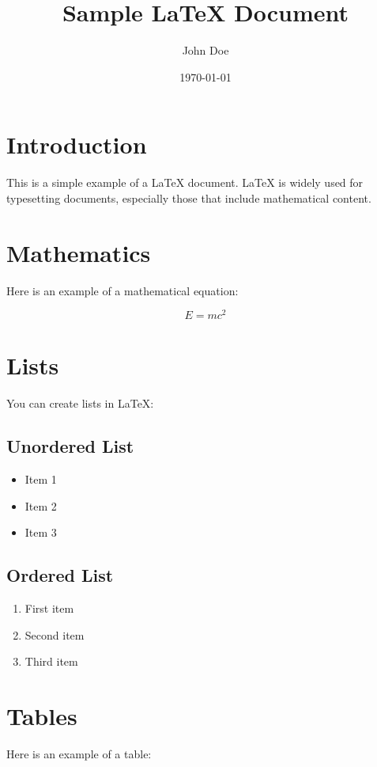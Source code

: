 \documentclass{article} %
\title{Sample LaTeX Document} %
\author{John Doe} %
\date{\today} %
\begin{document}

\maketitle %

\section{Introduction} %
This is a simple example of a LaTeX document. LaTeX is widely used for typesetting documents, especially those that include mathematical content.

\section{Mathematics} %
Here is an example of a mathematical equation:

\begin{equation} %
E = mc^2
\end{equation}

\section{Lists} %
You can create lists in LaTeX:

\subsection{Unordered List} %
\begin{itemize}
    \item Item 1
    \item Item 2
    \item Item 3
\end{itemize}

\subsection{Ordered List} %
\begin{enumerate}
    \item First item
    \item Second item
    \item Third item
\end{enumerate}

\section{Tables} %
Here is an example of a table:
\end{document}
